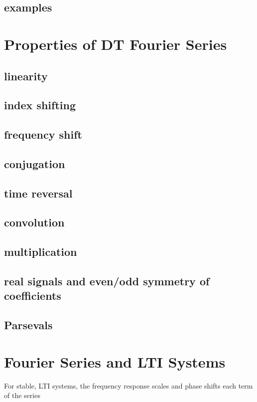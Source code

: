 \documentclass{article}
\begin{document}
\subsection{examples}
\label{sec:org95c7e81}
\section{Properties of DT Fourier Series}
\label{sec:org7340971}
\subsection{linearity}
\label{sec:orga5b5f77}
\subsection{index shifting}
\label{sec:org1c757d9}
\subsection{frequency shift}
\label{sec:org4fedcd7}
\subsection{conjugation}
\label{sec:org9ab6428}
\subsection{time reversal}
\label{sec:org31bf958}
\subsection{convolution}
\label{sec:orgdefee2c}
\subsection{multiplication}
\label{sec:orge18d485}
\subsection{real signals and even/odd symmetry of coefficients}
\label{sec:org836e5ec}
\subsection{Parsevals}
\label{sec:org701c799}
\section{Fourier Series and LTI Systems}
\label{sec:org292ffbc}
For stable, LTI systems, the frequency response scales and phase shifts each term of the series
\end{document}
